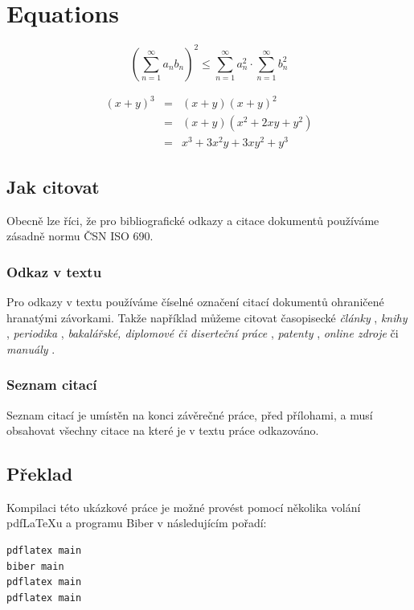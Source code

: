 \documentclass[czech,master,dept460,male,cpp,cpdeclaration]{diploma}
\begin{document}
\section{Equations}

\begin{equation}
  \left(\sum_{n=1}^{\infty}a_{n}b_{n}\right)^{2} \leq
  \sum_{n=1}^{\infty}a_{n}^{2} \cdot \sum_{n=1}^{\infty}b_{n}^{2}
  \label{eq:A}
\end{equation}

\begin{eqnarray}
  (x+y)^{3} & = & (x+y)(x+y)^{2}\label{eq:B}\\
  & = & (x+y)(x^{2}+2xy+y^{2})\nonumber\\
  & = & x^{3}+3x^{2}y+3xy^{2}+y^{3}\label{eq:C}
\end{eqnarray}
\subsection{Jak citovat}
Obecně lze říci, že pro bibliografické odkazy a citace dokumentů používáme zásadně normu ČSN ISO 690.
\subsubsection{Odkaz v textu}
Pro odkazy v textu používáme číselné označení citací dokumentů ohraničené hranatými závorkami. Takže například můžeme citovat časopisecké \emph{články} \cite{herrmann, bertram, moore, yoon, sigfridsson, baez/article}, \emph{knihy} \cite{wilde, nietzsche:ksa1, averroes/bland, hammond, cotton, knuth:ct:a, gerhardt, gonzalez, companion}, \emph{periodika} \cite{jcg}, \emph{bakalářské, diplomové či diserteční práce} \cite{geer}, \emph{patenty} \cite{kowalik, almendro, sorace, laufenberg}, \emph{online zdroje} \cite{ctan, wassenberg, itzhaki, markey, baez/online} či \emph{manuály} \cite{cms}.

\subsubsection{Seznam citací}
Seznam citací je umístěn na konci závěrečné práce, před přílohami, a musí obsahovat všechny citace na které je v textu práce odkazováno.  

\subsection{Překlad}
Kompilaci této ukázkové práce je možné provést pomocí několika volání pdf\LaTeX{}u a programu Biber v následujícím pořadí:
\begin{verbatim}
pdflatex main
biber main
pdflatex main
pdflatex main
\end{verbatim}


\printbibliography[title={Literatura}, heading=bibintoc]


\appendix
\end{document}
